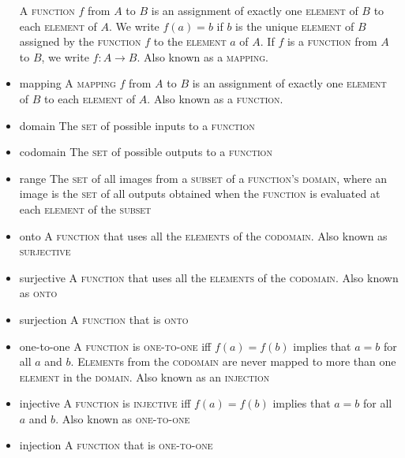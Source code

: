 \documentclass{article}
\newcommand{\term}[1]{\textsc{#1}}
\begin{document}
\begin{itemize}
  \subitem A \term{function} $f$ from $A$ to $B$ is an assignment of exactly one \term{element} of $B$ to each \term{element} of $A$. We write $f(a) = b$ if $b$ is the unique \term{element} of $B$ assigned by the \term{function} $f$ to the \term{element} $a$ of $A$. If $f$ is a \term{function} from $A$ to $B$, we write $f \colon A \to B$. Also known as a \term{mapping}.
\item mapping
  \subitem A \term{mapping} $f$ from $A$ to $B$ is an assignment of exactly one \term{element} of $B$ to each \term{element} of $A$. Also known as a \term{function}.
\item domain
   \subitem The \term{set} of possible inputs to a \term{function}
\item codomain
   \subitem The \term{set} of possible outputs to a \term{function}
\item range
   \subitem The \term{set} of all images from a \term{subset} of a \term{function's} \term{domain}, where an image is the \term{set} of all outputs obtained when the \term{function} is evaluated at each \term{element} of the \term{subset}
\item onto
   \subitem A \term{function} that uses all the \term{elements} of the \term{codomain}. Also known as \term{surjective}
\item surjective
   \subitem A \term{function} that uses all the \term{elements} of the \term{codomain}. Also known as \term{onto}
\item surjection
   \subitem A \term{function} that is \term{onto}
\item one-to-one
   \subitem A \term{function} is \term{one-to-one} iff $f(a) = f(b)$ implies that $a = b$ for all $a$ and $b$. \term{Element}s from the \term{codomain} are never mapped to more than one \term{element} in the \term{domain}. Also known as an \term{injection}
\item injective
   \subitem A \term{function} is \term{injective} iff $f(a) = f(b)$ implies that $a = b$ for all $a$ and $b$. Also known as \term{one-to-one}
\item injection
   \subitem A \term{function} that is \term{one-to-one}
\end{itemize}
\end{document}
